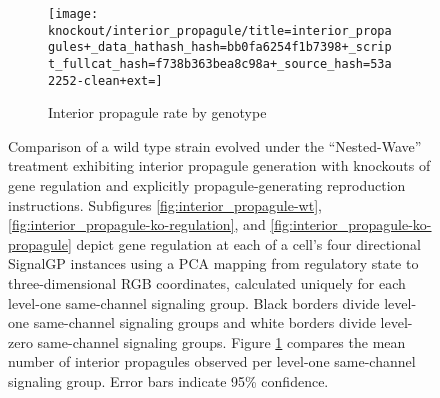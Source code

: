 \begin{figure}[!htbp]
\begin{center}
\hspace*{\fill}%
\begin{minipage}[t]{\columnwidth}
\centering
\vspace{0pt} %
\begin{subfigure}[b]{\textwidth}
\texttt{[image: knockout/interior\_propagule/title=interior\_propagules+\_data\_hathash\_hash=bb0fa6254f1b7398+\_script\_fullcat\_hash=f738b363bea8c98a+\_source\_hash=53a2252-clean+ext=]}%
\caption{Interior propagule rate by genotype}
\label{fig:interior_propagule_rate}
\end{subfigure}
\end{minipage}%
\hspace*{\fill}


\caption{
Comparison of a wild type strain evolved under the ``Nested-Wave'' treatment exhibiting interior propagule generation with knockouts of gene regulation and explicitly propagule-generating reproduction instructions.
Subfigures \ref{fig:interior_propagule-wt}, \ref{fig:interior_propagule-ko-regulation}, and \ref{fig:interior_propagule-ko-propagule} depict gene regulation at each of a cell's four directional SignalGP instances using a PCA mapping from regulatory state to three-dimensional RGB coordinates, calculated uniquely for each level-one same-channel signaling group.
Black borders divide level-one same-channel signaling groups and white borders divide level-zero same-channel signaling groups.
Figure \ref{fig:interior_propagule_rate} compares the mean number of interior propagules observed per level-one same-channel signaling group.
Error bars indicate 95\% confidence.
}
\label{fig:ko-interior_propagule}
\end{center}
\end{figure}
